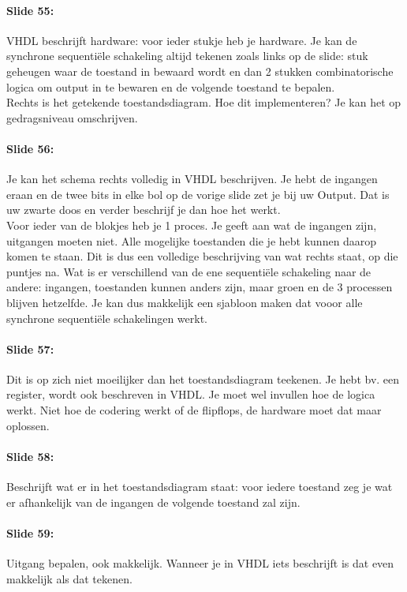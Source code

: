 \documentclass[10pt,a4paper]{book}
\begin{document}
\paragraph{Slide 55:} VHDL beschrijft hardware: voor ieder stukje heb je hardware. Je kan de synchrone sequenti\"ele schakeling altijd tekenen zoals links op de slide: stuk geheugen waar de toestand in bewaard wordt en dan 2 stukken combinatorische logica om output in te bewaren en de volgende toestand te bepalen.\\
Rechts is het getekende toestandsdiagram. Hoe dit implementeren? Je kan het op gedragsniveau omschrijven.

\paragraph{Slide 56:} Je kan het schema rechts volledig in VHDL beschrijven. Je hebt de ingangen eraan en de twee bits in elke bol op de vorige slide zet je bij uw Output. Dat is uw zwarte doos en verder beschrijf je dan hoe het werkt.\\
Voor ieder van de blokjes heb je 1 proces. Je geeft aan wat de ingangen zijn, uitgangen moeten niet.
Alle mogelijke toestanden die je hebt kunnen daarop komen te staan.
Dit is dus een volledige beschrijving van wat rechts staat, op die puntjes na.
Wat is er verschillend van de ene sequenti\"ele schakeling naar de andere: ingangen, toestanden kunnen anders zijn, maar groen en de 3 processen blijven hetzelfde.
Je kan dus makkelijk een sjabloon maken dat vooor alle synchrone sequenti\"ele schakelingen werkt. 

\paragraph{Slide 57:} Dit is op zich niet moeilijker dan het toestandsdiagram teekenen. Je hebt bv. een register, wordt ook beschreven in VHDL. Je moet wel invullen hoe de logica werkt. Niet hoe de codering werkt of de flipflops, de hardware moet dat maar oplossen.

\paragraph{Slide 58:} Beschrijft wat er in het toestandsdiagram staat: voor iedere toestand zeg je wat er afhankelijk van de ingangen de volgende toestand zal zijn. 

\paragraph{Slide 59:} Uitgang bepalen, ook makkelijk. Wanneer je in VHDL iets beschrijft is dat even makkelijk als dat tekenen.
\end{document}
